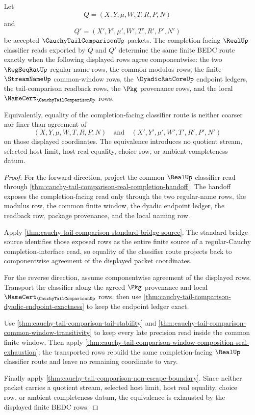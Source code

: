 \begin{theorem}
\label{thm:cauchy-tail-comparison-completion-classifier-equivalence}
Let
$$
Q=(X,Y,\mu,W,T,R,P,N)
$$
and
$$
Q'=(X',Y',\mu',W',T',R',P',N')
$$
be accepted $\CauchyTailComparisonUp$ packets. The completion-facing $\RealUp$ classifier reads exported by $Q$ and $Q'$ determine the same finite BEDC route exactly when the following displayed rows agree componentwise: the two $\RegSeqRatUp$ regular-name rows, the common modulus rows, the finite $\StreamNameUp$ common-window rows, the $\DyadicRatCoreUp$ endpoint ledgers, the tail-comparison readback rows, the $\Pkg$ provenance rows, and the local $\NameCert_{\CauchyTailComparisonUp}$ rows.

Equivalently, equality of the completion-facing classifier route is neither coarser nor finer than agreement of
$$
(X,Y,\mu,W,T,R,P,N)
\quad\text{and}\quad
(X',Y',\mu',W',T',R',P',N')
$$
on those displayed coordinates. The equivalence introduces no quotient stream, selected host limit, host real equality, choice row, or ambient completeness datum.
\end{theorem}
\begin{proof}
For the forward direction, project the common $\RealUp$ classifier read through \autoref{thm:cauchy-tail-comparison-real-completion-handoff}. The handoff exposes the completion-facing read only through the two regular-name rows, the modulus row, the common finite window, the dyadic endpoint ledger, the readback row, package provenance, and the local naming row.

Apply \autoref{thm:cauchy-tail-comparison-standard-bridge-source}. The standard bridge source identifies those exposed rows as the entire finite source of a regular-Cauchy completion-interface read, so equality of the classifier route projects back to componentwise agreement of the displayed packet coordinates.

For the reverse direction, assume componentwise agreement of the displayed rows. Transport the classifier along the agreed $\Pkg$ provenance and local $\NameCert_{\CauchyTailComparisonUp}$ rows, then use \autoref{thm:cauchy-tail-comparison-dyadic-endpoint-exactness} to keep the endpoint ledger exact.

Use \autoref{thm:cauchy-tail-comparison-tail-stability} and \autoref{thm:cauchy-tail-comparison-common-window-transitivity} to keep every late precision read inside the common finite window. Then apply \autoref{thm:cauchy-tail-comparison-window-composition-seal-exhaustion}; the transported rows rebuild the same completion-facing $\RealUp$ classifier route and leave no remaining coordinate to vary.

Finally apply \autoref{thm:cauchy-tail-comparison-non-escape-boundary}. Since neither packet carries a quotient stream, selected host limit, host real equality, choice row, or ambient completeness datum, the equivalence is exhausted by the displayed finite BEDC rows.
\end{proof}

